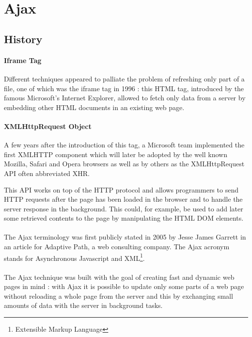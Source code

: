 \section{Ajax}

\subsection{History}

\paragraph{Iframe Tag} Different techniques \cite{ajax-wikipedia} appeared to 
palliate the problem of refreshing only part of a file, one of which was the 
iframe tag in 1996 : this HTML tag, introduced by the famous Microsoft's 
Internet Explorer, allowed to fetch only data from a server by embedding 
other HTML documents in an existing web page.

\paragraph{XMLHttpRequest Object} A few years after the introduction of this 
tag, a Microsoft team implemented the first XMLHTTP component which will later 
be adopted by the well known Mozilla, Safari and Opera browsers as well as by 
others as the XMLHttpRequest API often abbreviated XHR.

This API works on top of the HTTP protocol and allows programmers to 
send HTTP requests after the page has been loaded in the browser and to handle 
the server response in the background. This could, for example, be used to add 
later some retrieved contents to the page by manipulating the HTML DOM 
elements.

\paragraph{} The Ajax terminology was first publicly stated in 2005 by Jesse 
James Garrett in an article for Adaptive Path\cite{ajax-adaptivepath}, a 
web consulting company. The Ajax \cite{ajax-w3schools} acronym stands for 
Asynchronous Javascript and XML\footnote{Extensible Markup Language}.

\paragraph{} The Ajax technique was built with the goal of creating fast and 
dynamic web pages in mind : with Ajax it is possible to update only 
some parts of a web page without reloading a whole page from the server and 
this by exchanging small amounts of data with the server in background tasks.

